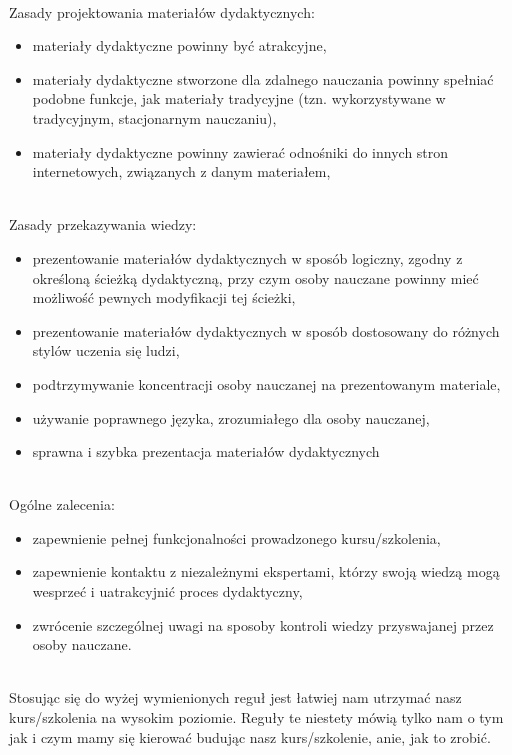 \ \\
Zasady projektowania materiałów dydaktycznych: \\
	\begin{itemize}
		\item materiały dydaktyczne powinny być atrakcyjne, 
		\item materiały dydaktyczne stworzone dla zdalnego nauczania powinny spełniać podobne funkcje, jak materiały tradycyjne (tzn. wykorzystywane w tradycyjnym, stacjonarnym nauczaniu), 
		\item materiały dydaktyczne powinny zawierać odnośniki do innych stron internetowych, związanych z danym materiałem, 
	\end{itemize}
\ \\
Zasady przekazywania wiedzy: \\
	\begin{itemize}
		\item prezentowanie materiałów dydaktycznych w sposób logiczny, zgodny z określoną ścieżką dydaktyczną, przy czym osoby nauczane powinny mieć możliwość pewnych modyfikacji tej ścieżki, 
		\item prezentowanie materiałów dydaktycznych w sposób dostosowany do różnych stylów uczenia się ludzi, 
		\item podtrzymywanie koncentracji osoby nauczanej na prezentowanym materiale, 
		\item używanie poprawnego języka, zrozumiałego dla osoby nauczanej, 
		\item sprawna i szybka prezentacja materiałów dydaktycznych 
	\end{itemize}
\ \\
Ogólne zalecenia: \\ 
	\begin{itemize}
		\item zapewnienie pełnej funkcjonalności prowadzonego kursu/szkolenia, 
		\item zapewnienie kontaktu z niezależnymi ekspertami, którzy swoją wiedzą mogą wesprzeć i uatrakcyjnić proces dydaktyczny, 
		\item zwrócenie szczególnej uwagi na sposoby kontroli wiedzy przyswajanej przez osoby nauczane. 
	\end{itemize}
\ \\
Stosując się do wyżej wymienionych reguł jest łatwiej nam utrzymać nasz kurs/szkolenia na wysokim poziomie. Reguły te niestety mówią tylko nam o tym jak i czym mamy się kierować budując nasz kurs/szkolenie, anie, jak to zrobić.
